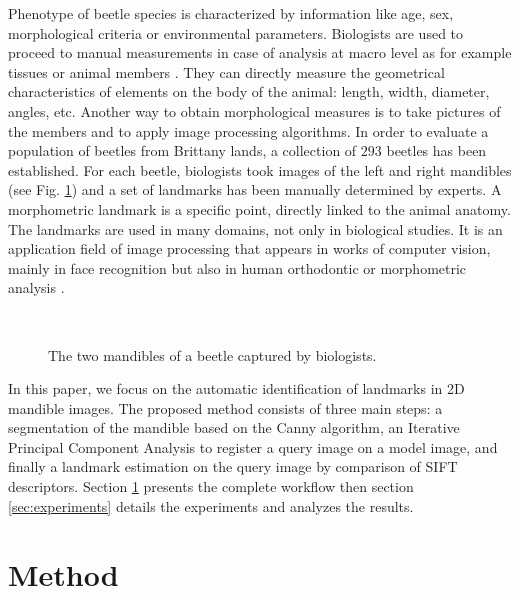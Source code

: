 \documentclass[twoside,twocolumn,10pt]{article}
\begin{document}
\copyrightspace
Phenotype of beetle species is characterized by information like age, sex, morphological criteria or environmental parameters.
 Biologists are used to proceed to manual measurements in case of analysis at macro level as for example tissues or animal members \cite{houle2003automated} \cite{bromiley2014semi}.
 They can directly measure the geometrical characteristics of elements on the body of the animal: length, width, diameter, angles, etc.
 Another way to obtain morphological measures is to take pictures of the members and to apply image processing algorithms.
 In order to evaluate a population of beetles from Brittany lands, a collection of $293$ beetles has been established.
 For each beetle, biologists took images of the left and right mandibles (see Fig. \ref{figparts}) and a set of landmarks has been manually determined by experts.
 A morphometric landmark is a specific point, directly linked to the animal anatomy.
 The landmarks are used in many domains, not only in biological studies.
 It is an application field of image processing \cite{li09} that appears in works of computer vision, mainly in face recognition \cite{zhang2014facial} but also in human orthodontic \cite{favaedi2010cephalometric} or morphometric
 analysis \cite{bec03}.

\begin{figure}[htbp]
\centering
{}~~
\caption{The two mandibles of a beetle captured by biologists.}
\label{figparts}
\end{figure}

In this paper, we focus on the automatic identification of landmarks in 2D mandible images.
The proposed method consists of three main steps: a segmentation of the mandible based on the Canny algorithm, an Iterative Principal
Component Analysis to register a query image on a model image, and finally a landmark estimation on the query image by comparison of SIFT descriptors.
Section \ref{sec:method} presents the complete workflow then section \ref{sec:experiments} details the experiments and analyzes the results.


\section{Method}
\label{sec:method}
\end{document}
